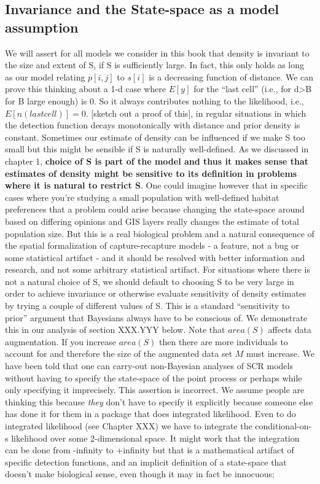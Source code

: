 \subsection{Invariance and the State-space as a model assumption}
We will assert for all models we consider in this book that density is invariant to the size and extent of S, if S is sufficiently large. In fact, this only holds as long as our model relating $p[i,j]$ to $s[i]$ is a decreasing function of distance.  We can prove this thinking about a 1-d case where $E[y]$ for the ``last cell'' (i.e., for d>B for B large enough) is 0. So it always contributes nothing to the likelihood, i.e., $E[n(last cell)] = 0$. [sketch out a proof of this], in regular situations in which the detection function decays monotonically with distance and prior density is constant.
Sometimes our estimate of density can be influenced if we make S too
small but this might be sensible if S is naturally well-defined. As we
discussed in chapter 1, {\bf choice of S is part of the model and thus it makes sense that estimates of density might be sensitive to its definition in problems where it is natural to restrict S}.  One could imagine however that in specific cases where you're studying a small population with well-defined habitat preferences that a problem could arise because changing the state-space around based on differing opinions and GIS layers really changes the estimate of total population size. But this is a real biological problem and a natural consequence of the spatial formalization of capture-recapture models - a feature, not a bug or some statistical artifact - and it should be resolved with better information and research, and not some arbitrary statistical artifact.  For situations where there is not a natural choice of S, we should default to choosing S to be very large in order to achieve invariance or otherwise evaluate sensitivity of density estimates by trying a couple of different values of S. This is a standard ``sensitivity to prior'' argument that Bayesians always have to be conscious of.   We demonstrate this in our analysis of section XXX.YYY below. Note that $area(S)$ affects data augmentation. If you increase $area(S)$ then there are more individuals to account for and therefore the size of the augmented data set $M$ must increase. 
We have been told that one can carry-out non-Bayesian analyses of SCR models without having to specify the state-space of the point process or perhaps while only specifying it imprecisely.  This assertion is incorrect. We assume people are thinking this because {\it they} don't have to specify it explicitly because someone else has done it for them in a package that does integrated likelihood. Even to do integrated likelihood (see Chapter XXX) we have to integrate the conditional-on-s likelihood over some 2-dimensional space.  It might work that the integration can be done from -infinity to +infinity but that is a mathematical artifact of specific detection functions, and an implicit definition of a state-space that doesn't make biological sense, even though it may in fact be innocuous; 


